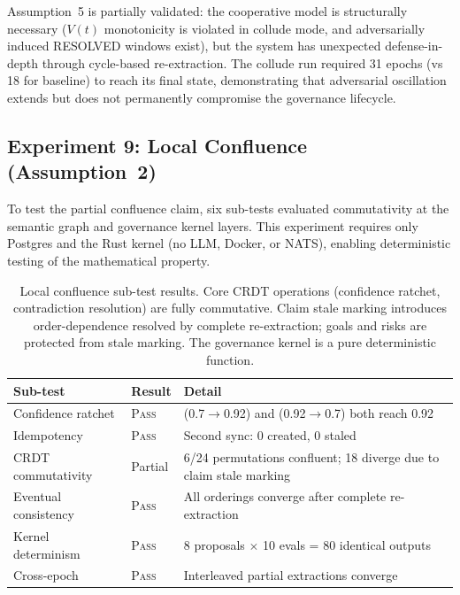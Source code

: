 \documentclass[11pt]{article}
\begin{document}
Assumption~5 is partially validated: the cooperative model is structurally necessary ($V(t)$ monotonicity is violated in collude mode, and adversarially induced RESOLVED windows exist), but the system has unexpected defense-in-depth through cycle-based re-extraction. The collude run required 31 epochs (vs 18 for baseline) to reach its final state, demonstrating that adversarial oscillation extends but does not permanently compromise the governance lifecycle.

\subsection{Experiment 9: Local Confluence (Assumption~2)}

To test the partial confluence claim, six sub-tests evaluated commutativity at the semantic graph and governance kernel layers. This experiment requires only Postgres and the Rust kernel (no LLM, Docker, or NATS), enabling deterministic testing of the mathematical property.

\begin{table}[H]
\centering
\small
\begin{tabular}{llp{7.5cm}}
\toprule
\textbf{Sub-test} & \textbf{Result} & \textbf{Detail} \\
\midrule
Confidence ratchet & \textsc{Pass} & (0.7$\to$0.92) and (0.92$\to$0.7) both reach 0.92 \\
Idempotency & \textsc{Pass} & Second sync: 0 created, 0 staled \\
CRDT commutativity & Partial & 6/24 permutations confluent; 18 diverge due to claim stale marking \\
Eventual consistency & \textsc{Pass} & All orderings converge after complete re-extraction \\
Kernel determinism & \textsc{Pass} & 8 proposals $\times$ 10 evals = 80 identical outputs \\
Cross-epoch & \textsc{Pass} & Interleaved partial extractions converge \\
\bottomrule
\end{tabular}
\caption{Local confluence sub-test results. Core CRDT operations (confidence ratchet, contradiction resolution) are fully commutative. Claim stale marking introduces order-dependence resolved by complete re-extraction; goals and risks are protected from stale marking. The governance kernel is a pure deterministic function.}
\label{tab:exp9-results}
\end{table}
\end{document}
